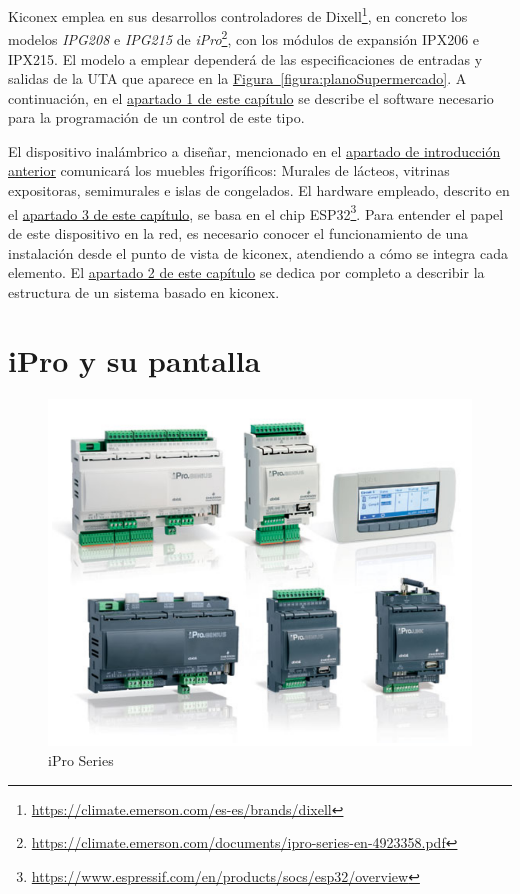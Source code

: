 Kiconex emplea en sus desarrollos controladores de Dixell\footnote{\url{https://climate.emerson.com/es-es/brands/dixell}}, en concreto los modelos \textit{IPG208} e \textit{IPG215} de \textit{iPro}\footnote{\url{https://climate.emerson.com/documents/ipro-series-en-4923358.pdf}}, con los módulos de expansión IPX206 e IPX215\footnotemark[2]. El modelo a emplear dependerá de las especificaciones de entradas y salidas de la UTA que aparece en la \hyperref[figura:planoSupermercado]{Figura~\ref{figura:planoSupermercado}}. A continuación, en el \hyperref[sec:kiconex]{apartado 1 de este capítulo} se describe el software necesario para la programación de un control de este tipo.

El dispositivo inalámbrico a diseñar, mencionado en el \hyperref[chap:intro]{apartado de introducción anterior} comunicará los muebles frigoríficos: Murales de lácteos, vitrinas expositoras, semimurales e islas de congelados. El hardware empleado, descrito en el \hyperref[sec:esp32poe]{apartado 3 de este capítulo}, se basa en el chip ESP32\footnote{\url{https://www.espressif.com/en/products/socs/esp32/overview}}. Para entender el papel de este dispositivo en la red, es necesario conocer el funcionamiento de una instalación desde el punto de vista de kiconex, atendiendo a cómo se integra cada elemento. El \hyperref[sec:kiconex]{apartado 2 de este capítulo} se dedica por completo a describir la estructura de un sistema basado en kiconex.

\section{iPro y su pantalla}
\label{sec:iproypantalla}

\begin{figure}[h]
  \centering
  \includegraphics[width=12cm, keepaspectratio]{img/iproSeries}
  \caption{iPro Series}
  \label{figura:iproSeries}
\end{figure}

